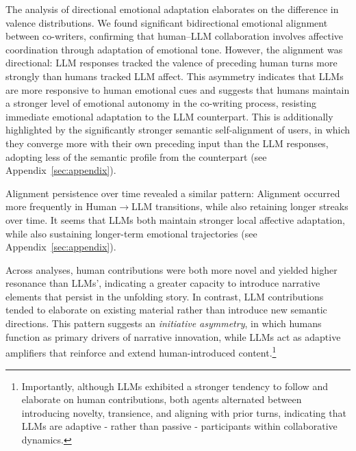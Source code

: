 \documentclass[11pt]{article}
\begin{document}
The analysis of directional emotional adaptation elaborates on the difference in valence distributions. We found significant bidirectional emotional alignment between co-writers, confirming that human--LLM collaboration involves affective coordination through adaptation of emotional tone. However, the alignment was directional: LLM responses tracked the valence of preceding human turns more strongly than humans tracked LLM affect. This asymmetry indicates that LLMs are more responsive to human emotional cues and suggests that humans maintain a stronger level of emotional autonomy in the co-writing process, resisting immediate emotional adaptation to the LLM counterpart. This is additionally highlighted by the significantly stronger semantic self-alignment of users, in which they converge more with their own preceding input than the LLM responses, adopting less of the semantic profile from the counterpart (see Appendix~\ref{sec:appendix}).

Alignment persistence over time revealed a similar pattern: Alignment occurred more frequently in Human$\rightarrow$LLM transitions, while also retaining longer streaks over time. It seems that LLMs both maintain stronger local affective adaptation, while also sustaining longer-term emotional trajectories (see Appendix~\ref{sec:appendix}).

Across analyses, human contributions were both more novel and yielded higher resonance than LLMs', indicating a greater capacity to introduce narrative elements that persist in the unfolding story. In contrast, LLM contributions tended to elaborate on existing material rather than introduce new semantic directions. This pattern suggests an \textit{initiative asymmetry}, in which humans function as primary drivers of narrative innovation, while LLMs act as adaptive amplifiers that reinforce and extend human-introduced content.\footnote{Importantly, although LLMs exhibited a stronger tendency to follow and elaborate on human contributions, both agents alternated between introducing novelty, transience, and aligning with prior turns, indicating that LLMs are adaptive - rather than passive - participants within collaborative dynamics.}
\end{document}
